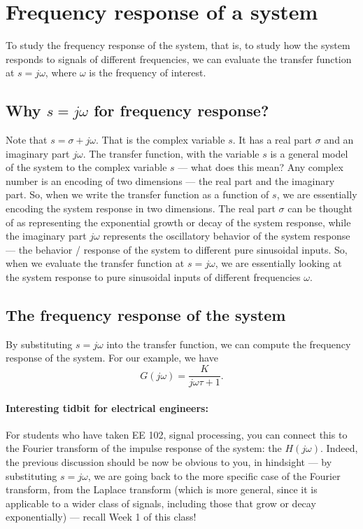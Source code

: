\documentclass{ee122_notes}
\begin{document}
\section{Frequency response of a system}
To study the frequency response of the system, that is, to study how the system responds to signals of different frequencies, we can evaluate the transfer function at \(s = j\omega\), where \(\omega\) is the frequency of interest. 
\subsection{Why $s = j\omega$ for frequency response?}
Note that $s = \sigma + j\omega$. That is the complex variable $s$. It has a real part $\sigma$ and an imaginary part $j\omega$. The transfer function, with the variable $s$ is a general model of the system to the complex variable $s$ --- what does this mean? Any complex number is an encoding of two dimensions --- the real part and the imaginary part. So, when we write the transfer function as a function of $s$, we are essentially encoding the system response in two dimensions. The real part $\sigma$ can be thought of as representing the exponential growth or decay of the system response, while the imaginary part $j\omega$ represents the oscillatory behavior of the system response --- the behavior / response of the system to different pure sinusoidal inputs. So, when we evaluate the transfer function at $s = j\omega$, we are essentially looking at the system response to pure sinusoidal inputs of different frequencies $\omega$. 

\subsection{The frequency response of the system}
By substituting \(s = j\omega\) into the transfer function, we can compute the frequency response of the system. For our example, we have
\[
G(j\omega) = \frac{K}{j\omega\tau + 1}.
\]

\paragraph{Interesting tidbit for electrical engineers:}
For students who have taken EE 102, signal processing, you can connect this to the Fourier transform of the impulse response of the system: the $H(j\omega)$. Indeed, the previous discussion should be now be obvious to you, in hindsight --- by substituting $s = j\omega$, we are going back to the more specific case of the Fourier transform, from the Laplace transform (which is more general, since it is applicable to a wider class of signals, including those that grow or decay exponentially) --- recall Week 1 of this class!
\end{document}
